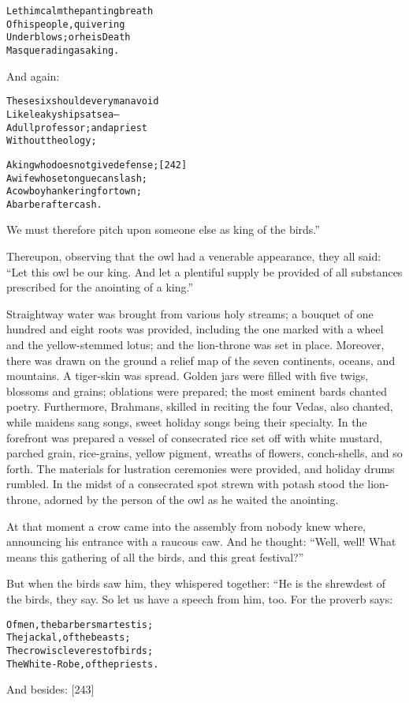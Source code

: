 \documentclass{article}
\renewenvironment{verbatim}{\begin{alltt}\normalfont\begin{centering}}{\end{centering}\end{alltt}}
\begin{document}
\begin{verbatim}
Let him calm the panting breath
    Of his people, quivering
Under blows; or he is Death
    Masquerading as a king.
\end{verbatim}
And again:

\begin{verbatim}
These six should every man avoid
    Like leaky ships at sea--
A dull professor; and a priest
    Without theology;

A king who does not give defense;                       [242]
    A wife whose tongue can slash;
A cowboy hankering for town;
    A barber after cash.
\end{verbatim}
We must therefore pitch upon someone else as king of the birds.”

Thereupon, observing that the owl had a venerable appearance, they
all said:
``Let this owl be our king. And let a plentiful supply be provided of all substances prescribed for the anointing of a king.''

Straightway water was brought from various holy streams; a bouquet
of one hundred and eight roots was provided, including the one
marked with a wheel and the yellow-stemmed lotus; and the
lion-throne was set in place. Moreover, there was drawn on the
ground a relief map of the seven continents, oceans, and mountains.
A tiger-skin was spread. Golden jars were filled with five twigs,
blossoms and grains; oblations were prepared; the most eminent
bards chanted poetry. Furthermore, Brahmans, skilled in reciting
the four Vedas, also chanted, while maidens sang songs, sweet
holiday songs being their specialty. In the forefront was prepared
a vessel of consecrated rice set off with white mustard, parched
grain, rice-grains, yellow pigment, wreaths of flowers,
conch-shells, and so forth. The materials for lustration ceremonies
were provided, and holiday drums rumbled. In the midst of a
consecrated spot strewn with potash stood the lion-throne, adorned
by the person of the owl as he waited the anointing.

At that moment a crow came into the assembly from nobody knew
where, announcing his entrance with a raucous caw. And he thought:
``Well, well! What means this gathering of all the birds, and this great festival?''

But when the birds saw him, they whispered together: “He is the
shrewdest of the birds, they say. So let us have a speech from him,
too. For the proverb says:

\begin{verbatim}
Of men, the barber smartest is;
    The jackal, of the beasts;
The crow is cleverest of birds;
    The White-Robe, of the priests.
\end{verbatim}
And besides: [243]
\end{document}
